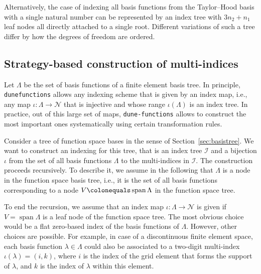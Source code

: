 \documentclass[a4paper,10pt,headings=normal,bibliography=totoc]{scrartcl}
\newcommand{\dunemodule}[1]{\texttt{#1}}
\begin{document}
Alternatively, the case of indexing all basis functions from the Taylor--Hood basis with a single
natural number can be represented by an index tree with $3 n_2 + n_1$ leaf nodes all
directly attached to a single root. Different variations of such a tree differ by how the
degrees of freedom are ordered.




\subsection{Strategy-based construction of multi-indices}
\label{sec:index_strategies}

Let $\Lambda$ be the set of basis functions of a finite element basis tree.
In principle, \dunemodule{dune\-functions} allows any indexing scheme that
is given by an index map, i.e., any map $\iota: \Lambda \to \mathcal{N}$ that
is injective and whose range $\iota(\Lambda)$ is an index tree.  In practice,
out of this large set of maps, \dunemodule{dune-functions} allows to construct the most
important ones systematically using certain transformation rules.

Consider a tree of function space bases in the sense of Section~\ref{sec:basistree}.
We want to construct an indexing for this tree, that is
an index tree $\mathcal{I}$ and a bijection $\iota$ from the set of all basis functions $\Lambda$
to the multi-indices in $\mathcal{I}$. The construction proceeds recursively.
To describe it,
we assume in the following that $\Lambda$ is a node in the function space
basis tree, i.e., it is the set of all basis functions
corresponding to a node $V \colonequals \operatorname{span} \Lambda$
in the function space tree.

To end the recursion, we assume that an index map $\iota : \Lambda \to \mathcal{N}$
is given if $V = \operatorname{span} \Lambda$ is a leaf node of the function space tree.
The most obvious choice would be a flat zero-based index
of the basis functions of $\Lambda$. However, other choices are possible.
For example, in case of a discontinuous finite element space, each
basis function $\lambda \in \Lambda$ could also be associated to a two-digit
multi-index $\iota(\lambda)=(i,k)$, where $i$ is the
index of the grid element that forms the support of $\lambda$, and $k$ is the index of $\lambda$
within this element.
\end{document}
